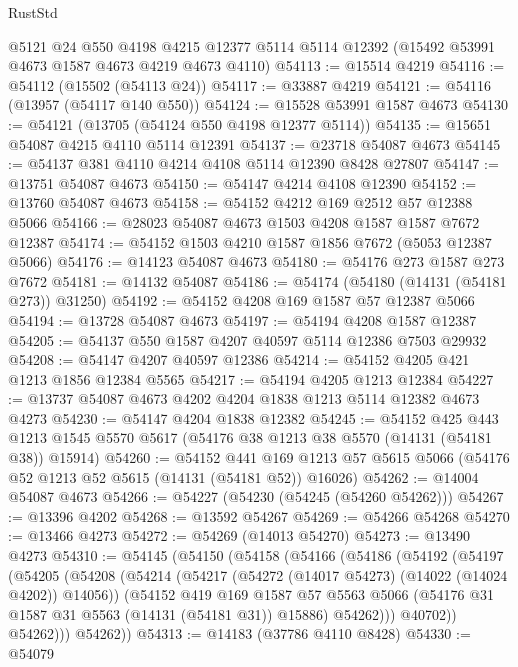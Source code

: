 \begin{lexlean}{RustStd}
\begin{coremodule}
    @5121
    @24
    @550
    @4198
    @4215
    @12377
    @5114
    @5114
    @12392
    (@15492 @53991 @4673 @1587 @4673 @4219 @4673 @4110)
@54113 := @15514 @4219
@54116 := @54112 (@15502 (@54113 @24))
@54117 := @33887 @4219
@54121 := @54116 (@13957 (@54117 @140 @550))
@54124 := @15528 @53991 @1587 @4673
@54130 := @54121 (@13705 (@54124 @550 @4198 @12377 @5114))
@54135 := @15651 @54087 @4215 @4110 @5114 @12391
@54137 := @23718 @54087 @4673
@54145 := @54137 @381 @4110 @4214 @4108 @5114 @12390 @8428 @27807
@54147 := @13751 @54087 @4673
@54150 := @54147 @4214 @4108 @12390
@54152 := @13760 @54087 @4673
@54158 := @54152 @4212 @169 @2512 @57 @12388 @5066
@54166 := @28023 @54087 @4673 @1503 @4208 @1587 @1587 @7672 @12387
@54174 := @54152 @1503 @4210 @1587 @1856 @7672 (@5053 @12387 @5066)
@54176 := @14123 @54087 @4673
@54180 := @54176 @273 @1587 @273 @7672
@54181 := @14132 @54087
@54186 := @54174 (@54180 (@14131 (@54181 @273)) @31250)
@54192 := @54152 @4208 @169 @1587 @57 @12387 @5066
@54194 := @13728 @54087 @4673
@54197 := @54194 @4208 @1587 @12387
@54205 := @54137 @550 @1587 @4207 @40597 @5114 @12386 @7503 @29932
@54208 := @54147 @4207 @40597 @12386
@54214 := @54152 @4205 @421 @1213 @1856 @12384 @5565
@54217 := @54194 @4205 @1213 @12384
@54227 := @13737 @54087 @4673 @4202 @4204 @1838 @1213 @5114 @12382 @4673 @4273
@54230 := @54147 @4204 @1838 @12382
@54245 := @54152
    @425
    @443
    @1213
    @1545
    @5570
    @5617
    (@54176 @38 @1213 @38 @5570 (@14131 (@54181 @38)) @15914)
@54260 := @54152
    @441
    @169
    @1213
    @57
    @5615
    @5066
    (@54176 @52 @1213 @52 @5615 (@14131 (@54181 @52)) @16026)
@54262 := @14004 @54087 @4673
@54266 := @54227 (@54230 (@54245 (@54260 @54262)))
@54267 := @13396 @4202
@54268 := @13592 @54267
@54269 := @54266 @54268
@54270 := @13466 @4273
@54272 := @54269 (@14013 @54270)
@54273 := @13490 @4273
@54310 := @54145
    (@54150
      (@54158
        (@54166
          (@54186
            (@54192
              (@54197
                (@54205
                  (@54208
                    (@54214
                      (@54217 (@54272 (@14017 @54273) (@14022 (@14024 @4202)) @14056))
                      (@54152
                        @419
                        @169
                        @1587
                        @57
                        @5563
                        @5066
                        (@54176 @31 @1587 @31 @5563 (@14131 (@54181 @31)) @15886)
                        @54262)))
                  @40702))
              @54262)))
        @54262))
@54313 := @14183 (@37786 @4110 @8428)
@54330 := @54079

\end{coremodule}
\end{lexlean}
